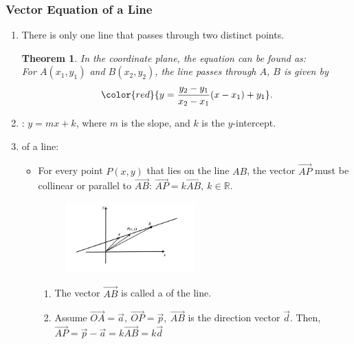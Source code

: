 \documentclass[12pt, a4paper]{article}
\newtheorem{theorem}{Theorem}[subsection]
\begin{document}
\subsubsection{Vector Equation of a Line}
\begin{enumerate}
  \item There is only one line that passes through two distinct points. 
  \begin{theorem}
  In the coordinate plane, the equation can be found as: \\
  For $A(x_1,y_1)$ and $B(x_2,y_2)$, the line passes through $A$, $B$ is given by $${\color{red}{y=\frac{y_2-y_1}{x_2-x_1}(x-x_1)+y_1}}.$$
  \end{theorem}
  \item {}: $y=mx+k$, where $m$ is the slope, and $k$ is the $y$-intercept.\\
  {}
  \item \textbf{\color{red}{Vector form}} of a line: 
  \begin{itemize}
    \item For every point $P(x,y)$ that lies on the line $AB$, the vector $\overrightarrow{AP}$ must be collinear or parallel to $\overrightarrow{AB}$: $\overrightarrow{AP}=k\overrightarrow{AB},\ k\in\mathbb{R}$.
    \begin{figure}[H]
      \centering
      \includegraphics[width=0.5\textwidth]{Fig.3.8.jpg}
    \end{figure}
    \begin{enumerate}
      \item The vector $\overrightarrow{AB}$ is called a \textbf{\color{red}{direction vector}} of the line. \\
      {}
      \item Assume $\overrightarrow{OA}=\vec{a},\ \overrightarrow{OP}=\vec{p},\ \overrightarrow{AB}$ is the direction vector $\vec{d}$. Then, $\overrightarrow{AP}=\vec{p}-\vec{a}=k\overrightarrow{AB}=k\vec{d}$

\end{enumerate}
\end{itemize}
\end{enumerate}
\end{document}

